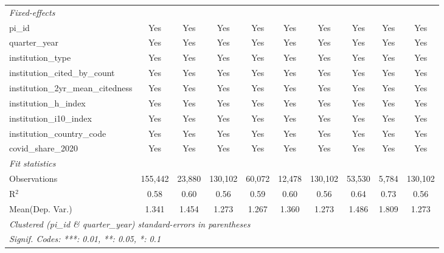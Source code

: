 \begin{tabular}{lccccccccc}
   \midrule
   \emph{Fixed-effects}\\
   pi\_id                                                      & Yes           & Yes           & Yes           & Yes           & Yes           & Yes           & Yes           & Yes           & Yes\\  
   quarter\_year                                               & Yes           & Yes           & Yes           & Yes           & Yes           & Yes           & Yes           & Yes           & Yes\\  
   institution\_type                                           & Yes           & Yes           & Yes           & Yes           & Yes           & Yes           & Yes           & Yes           & Yes\\  
   institution\_cited\_by\_count                               & Yes           & Yes           & Yes           & Yes           & Yes           & Yes           & Yes           & Yes           & Yes\\  
   institution\_2yr\_mean\_citedness                           & Yes           & Yes           & Yes           & Yes           & Yes           & Yes           & Yes           & Yes           & Yes\\  
   institution\_h\_index                                       & Yes           & Yes           & Yes           & Yes           & Yes           & Yes           & Yes           & Yes           & Yes\\  
   institution\_i10\_index                                     & Yes           & Yes           & Yes           & Yes           & Yes           & Yes           & Yes           & Yes           & Yes\\  
   institution\_country\_code                                  & Yes           & Yes           & Yes           & Yes           & Yes           & Yes           & Yes           & Yes           & Yes\\  
   covid\_share\_2020                                          & Yes           & Yes           & Yes           & Yes           & Yes           & Yes           & Yes           & Yes           & Yes\\  
   \midrule
   \emph{Fit statistics}\\
   Observations                                                & 155,442       & 23,880        & 130,102       & 60,072        & 12,478        & 130,102       & 53,530        & 5,784         & 130,102\\  
   R$^2$                                                       & 0.58          & 0.60          & 0.56          & 0.59          & 0.60          & 0.56          & 0.64          & 0.73          & 0.56\\  
Mean(Dep. Var.) & 1.341 & 1.454 & 1.273 & 1.267 & 1.360 & 1.273 & 1.486 & 1.809 & 1.273 \\
   \midrule \midrule
   \multicolumn{10}{l}{\emph{Clustered (pi\_id \& quarter\_year) standard-errors in parentheses}}\\
   \multicolumn{10}{l}{\emph{Signif. Codes: ***: 0.01, **: 0.05, *: 0.1}}\\
\end{tabular}
\par\endgroup
